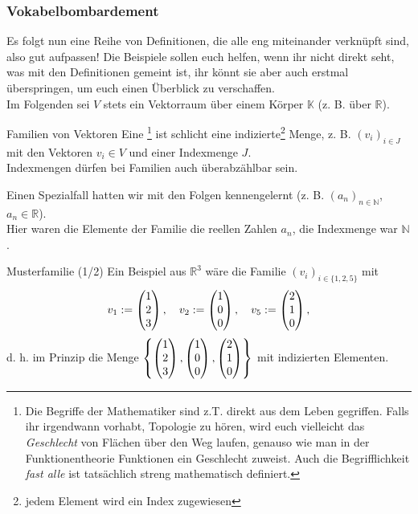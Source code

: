 \subsubsection{Vokabelbombardement}
Es folgt nun eine Reihe von Definitionen, die alle eng miteinander verknüpft sind, also gut aufpassen! Die Beispiele sollen euch helfen, wenn ihr nicht direkt seht, was mit den Definitionen gemeint ist, ihr könnt sie aber auch erstmal überspringen, um euch einen Überblick zu verschaffen.\\
Im Folgenden sei $V$ stets ein Vektorraum über einem Körper $\mathbb{K}$ (z. B. über $\mathbb{R}$).
\begin{Def}
{Familien von Vektoren}
Eine \footnote{Die Begriffe der Mathematiker sind z.T. direkt aus dem Leben gegriffen. Falls ihr irgendwann vorhabt, Topologie zu hören, wird euch vielleicht das \textit{Geschlecht} von Flächen über den Weg laufen, genauso wie man in der Funktionentheorie Funktionen ein Geschlecht zuweist. Auch die Begrifflichkeit \textit{fast alle} ist tatsächlich streng mathematisch definiert.} ist schlicht eine indizierte\footnote{jedem Element wird ein Index zugewiesen} Menge, z. B. $(v_i)_{i\in J}$ mit den Vektoren $v_i\in V$ und einer Indexmenge $J$.\\
Indexmengen dürfen bei Familien auch überabzählbar sein.
\end{Def}
Einen Spezialfall hatten wir mit den Folgen kennengelernt (z. B. $(a_n)_{n\in\mathbb{N}}$, $a_n\in\mathbb{R}$).\\
Hier waren die Elemente der Familie die reellen Zahlen $a_n$, die Indexmenge war $\mathbb{N}$.
\begin{Beispiel}
{Musterfamilie (1/2)}
Ein Beispiel aus $\mathbb{R}^3$ wäre die Familie $(v_i)_{i\in\{1,2,5\}}$ mit 
\begin{equation*}
    v_1:=\begin{pmatrix}1\\2\\3\end{pmatrix},\quad v_2:=\begin{pmatrix}1\\0\\0\end{pmatrix},\quad v_5:=\begin{pmatrix}2\\1\\0\end{pmatrix},
\end{equation*}
d. h. im Prinzip die Menge $\left\{\begin{pmatrix}1\\2\\3\end{pmatrix},\begin{pmatrix}1\\0\\0\end{pmatrix},\begin{pmatrix}2\\1\\0\end{pmatrix}\right\}$ mit indizierten Elementen.
\end{Beispiel}
